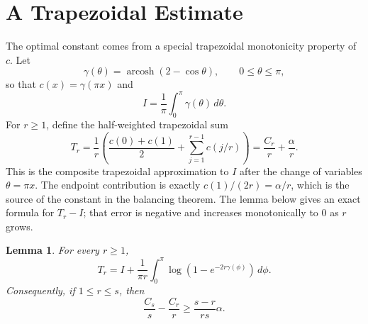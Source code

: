 \documentclass[11pt]{article}
\numberwithin{equation}{section}
\newtheorem{lemma}[lemma]{Lemma}
\DeclareMathOperator{\arcosh}{arcosh}
\newcommand{\dd}{\,d}
\begin{document}
\section{A Trapezoidal Estimate}\label{sec:trapezoidal-estimate}

The optimal constant comes from a special trapezoidal monotonicity property of $c$. Let
\[
  \gamma(\theta)=\arcosh(2-\cos\theta),
  \qquad 0\le\theta\le\pi,
\]
so that $c(x)=\gamma(\pi x)$ and
\[
  I=\frac1\pi\int_0^\pi\gamma(\theta)\dd\theta.
\]
For $r\ge1$, define the half-weighted trapezoidal sum
\[
  T_r=
  \frac1r\left(
  \frac{c(0)+c(1)}2+\sum_{j=1}^{r-1}c(j/r)
  \right)
  =
  \frac{C_r}{r}+\frac{\alpha}{r}.
\]
This is the composite trapezoidal approximation to $I$ after the change of variables $\theta=\pi x$. The endpoint contribution is exactly $c(1)/(2r)=\alpha/r$, which is the source of the constant in the balancing theorem. The lemma below gives an exact formula for $T_r-I$; that error is negative and increases monotonically to $0$ as $r$ grows.

\begin{lemma}\label{lem:trap}
For every $r\ge1$,
\begin{equation}\label{eq:trap-identity}
  T_r
  =
  I+
  \frac{1}{\pi r}
  \int_0^\pi
  \log\left(1-e^{-2r\gamma(\phi)}\right)\dd\phi.
\end{equation}
Consequently, if $1\le r\le s$, then
\begin{equation}\label{eq:C-trapezoidal}
  \frac{C_s}{s}-\frac{C_r}{r}
  \ge
  \frac{s-r}{rs}\alpha.
\end{equation}
\end{lemma}
\end{document}
